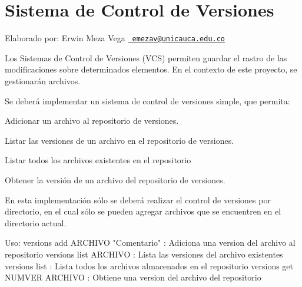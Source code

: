 \chapter{Sistema de Control de Versiones}
\hypertarget{index}{}\label{index}
\label{index_md_README}%
%
 Elaborado por\+: Erwin Meza Vega \href{mailto:emezav@unicauca.edu.co}{\texttt{ emezav@unicauca.\+edu.\+co}}

Los Sistemas de Control de Versiones (VCS) permiten guardar el rastro de las modificaciones sobre determinados elementos. En el contexto de este proyecto, se gestionarán archivos.

Se deberá implementar un sistema de control de versiones simple, que permita\+:


\begin{DoxyItemize}
\item Adicionar un archivo al repositorio de versiones.
\item Listar las versiones de un archivo en el repositorio de versiones.
\item Listar todos los archivos existentes en el repositorio
\item Obtener la versión de un archivo del repositorio de versiones.
\end{DoxyItemize}

En esta implementación sólo se deberá realizar el control de versiones por directorio, en el cual sólo se pueden agregar archivos que se encuentren en el directorio actual.

Uso\+: versions add ARCHIVO "{}\+Comentario"{} \+: Adiciona una version del archivo al repositorio versions list ARCHIVO \+: Lista las versiones del archivo existentes versions list \+: Lista todos los archivos almacenados en el repositorio versions get NUMVER ARCHIVO \+: Obtiene una version del archivo del repositorio 